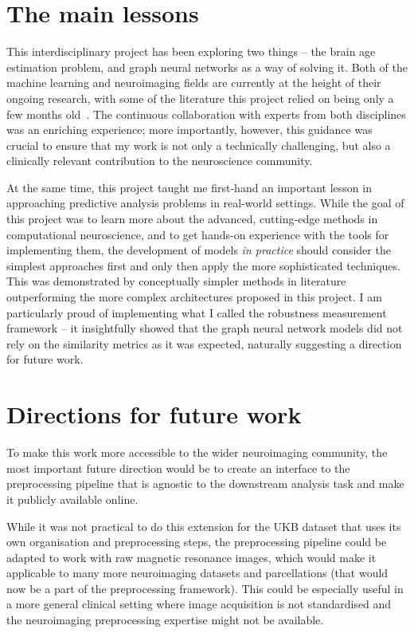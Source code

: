 \section{The main lessons}
This interdisciplinary project has been exploring two things – the brain age estimation problem, and graph neural networks as a way of solving it. Both of the machine learning and neuroimaging fields are currently at the height of their ongoing research, with some of the literature this project relied on being only a few months old~\cite{kaufmann2019, niu2019improved, pervaiz2020optimising}. The continuous collaboration with experts from both disciplines was an enriching experience; more importantly, however, this guidance was crucial to ensure that my work is not only a technically challenging, but also a clinically relevant contribution to the neuroscience community.

At the same time, this project taught me first-hand an important lesson in approaching predictive analysis problems in real-world settings. While the goal of this project was to learn more about the advanced, cutting-edge methods in computational neuroscience, and to get hands-on experience with the tools for implementing them, the development of models \textit{in practice} should consider the simplest approaches first and only then apply the more sophisticated techniques. This was demonstrated by conceptually simpler methods in literature outperforming the more complex architectures proposed in this project. I am particularly proud of implementing what I called the robustness measurement framework – it insightfully showed that the graph neural network models did not rely on the similarity metrics as it was expected, naturally suggesting a direction for future work.

\section{Directions for future work}
To make this work more accessible to the wider neuroimaging community, the most important future direction would be to create an interface to the preprocessing pipeline that is agnostic to the downstream analysis task and make it publicly available online. 

While it was not practical to do this extension for the UKB dataset that uses its own organisation and preprocessing steps, the preprocessing pipeline could be adapted to work with raw magnetic resonance images, which would make it applicable to many more neuroimaging datasets and parcellations (that would now be a part of the preprocessing framework). This could be especially useful in a more general clinical setting where image acquisition is not standardised and the neuroimaging preprocessing expertise might not be available.

